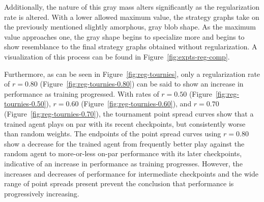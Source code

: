 Additionally,
the nature of this gray mass alters significantly as the regularization rate is
altered.
%
With a lower allowed maximum value,
the strategy graphs take on the previously mentioned slightly amorphous, gray
blob shape.
%
As the maximum value approaches one,
the gray shape begins to specialize more and begins to show resemblance to the
final strategy graphs obtained without regularization.
%
A visualization of this process can be found in
Figure~\ref{fig:expts-reg-comp}.



Furthermore,
as can be seen in Figure~\ref{fig:reg-tournies},
only a regularization rate of $r = 0.80$ (Figure~\ref{fig:reg-tournies-0.80})
can be said to show an increase in performance as training progressed.
%
With rates of $r=0.50$ (Figure~\ref{fig:reg-tournies-0.50}),
$r = 0.60$ (Figure~\ref{fig:reg-tournies-0.60}),
and $r = 0.70$ (Figure~\ref{fig:reg-tournies-0.70}),
the tournament point spread curves show that a trained agent plays on par with
its recent checkpoints,
but consistently worse than random weights.
%
The endpoints of the point spread curves using $r = 0.80$
show a decrease for the trained agent from frequently better play against the
random agent
to more-or-less on-par performance with its later checkpoints,
indicative of an increase in performance as training progresses.
%
However,
the increases and decreases of performance for intermediate checkpoints
and the wide range of point spreads present
prevent the conclusion that performance is progressively increasing.

